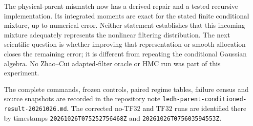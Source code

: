 The physical-parent mismatch now has a derived repair and a tested recursive
implementation. Its integrated moments are exact for the stated finite
conditional mixture, up to numerical error. Neither statement establishes
that this incoming mixture adequately represents the nonlinear filtering
distribution. The next scientific question is whether improving that
representation or smooth allocation closes the remaining error; it is
different from repeating the conditional Gaussian algebra. No Zhao--Cui
adapted-filter oracle or HMC run was part of this experiment.

The complete commands, frozen controls, paired regime tables, failure census
and source snapshots are recorded in the repository note
\texttt{ledh-parent-conditioned-result-20261026.md}. The corrected no-TF32
and TF32 runs are identified there by timestamps
\texttt{20261026T075252756468Z} and \texttt{20261026T075603594553Z}.
